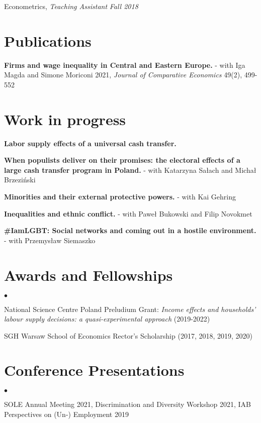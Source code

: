 \documentclass[margin,line]{res}
\newenvironment{list2}{
  \begin{list}{$\bullet$}{%
      \setlength{\itemsep}{0in}
      \setlength{\parsep}{0in} \setlength{\parskip}{0in}
      \setlength{\topsep}{0in} \setlength{\partopsep}{0in} 
      \setlength{\leftmargin}{0.2in}}}{\end{list}}
\begin{document}
\begin{resume}
\vspace{-.3cm}
Econometrics, \textit{Teaching Assistant} \hfill \textit{Fall 2018}\\
\vspace*{.05in}  

\section{\sc Publications}
\textbf{Firms and wage inequality in Central and Eastern Europe.} - with Iga Magda and Simone Moriconi 2021, \textit{Journal of Comparative Economics} 49(2), 499-552
\vspace*{.05in}  
\section{\sc Work in progress}

\textbf{Labor supply effects of a universal cash transfer. }

\textbf{When populists deliver on their promises: the electoral effects of a large cash transfer program in Poland.} - with Katarzyna Sałach and Michał Brzeziński

\textbf{Minorities and their external protective powers. } - with Kai Gehring

\textbf{Inequalities and ethnic conflict.} - with Paweł Bukowski and Filip Novokmet

\textbf{\#IamLGBT: Social networks and coming out in a hostile environment.} - with Przemysław Siemaszko
\vspace*{.05in}  
\section{\sc Awards and Fellowships} 
\begin{list2}
\item National Science Centre Poland Preludium Grant: \textit{Income effects and households' labour supply decisions: a quasi-experimental approach} (2019-2022)
\item SGH Warsaw School of Economics Rector's Scholarship (2017, 2018, 2019, 2020)
\end{list2}
\vspace*{.05in} 
\section{\sc Conference Presentations} 
\begin{list2}
	\item SOLE Annual Meeting 2021, Discrimination and Diversity Workshop 2021, IAB Perspectives on (Un-) Employment 2019 
\end{list2}
\vspace*{.05in} 

\end{resume}
\end{document}
